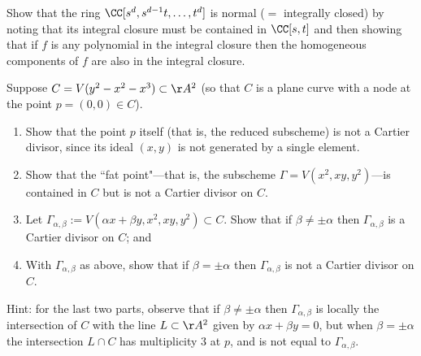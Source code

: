 \begin{exercise}\label{normality of RNC}
 Show that the ring $\CC[s^d,s^{d-1}t,\dots, t^d]$ is normal ($=$ integrally closed) by noting that its integral closure must be
 contained in $\CC[s,t]$ and then showing that if $f$ is any polynomial
 in the integral closure then the homogeneous components of $f$ are also in the integral closure.
\end{exercise}

\begin{exercise}\label{Cartier examples}
Suppose $C = V(y^2 - x^2 - x^3) \subset \AA^2$ (so that $C$ is a plane curve with a node at the point $p = (0,0) \in C$). 
\begin{enumerate}
\item Show that the point $p$ itself (that is, the reduced subscheme) is not a Cartier divisor, since its ideal $(x,y)$ is not generated by a single element. 
\item Show that the ``fat point"---that is, the subscheme $\Gamma = V(x^2, xy, y^2)$---is contained in $C$ but is not a Cartier divisor on $C$. 
\item Let $\Gamma_{\alpha, \beta} := V(\alpha x + \beta y, x^2, xy, y^2) \subset C$. Show that if $\beta \neq \pm \alpha$ then $\Gamma_{\alpha, \beta}$ is a Cartier divisor on $C$; and
\item With $\Gamma_{\alpha, \beta}$ as above, show that if $\beta = \pm \alpha$ then $\Gamma_{\alpha, \beta}$ is not a Cartier divisor on $C$.
\end{enumerate}

Hint: for the last two parts, observe that if $\beta \neq \pm \alpha$ then $\Gamma_{\alpha, \beta}$  is locally the intersection of $C$ with the line $L \subset \AA^2$ given by $\alpha x + \beta y = 0$, but when $\beta = \pm \alpha$ 
the intersection $L \cap C$ has multiplicity 3 at $p$, and is not equal to $\Gamma_{\alpha, \beta}$.
\end{exercise}



